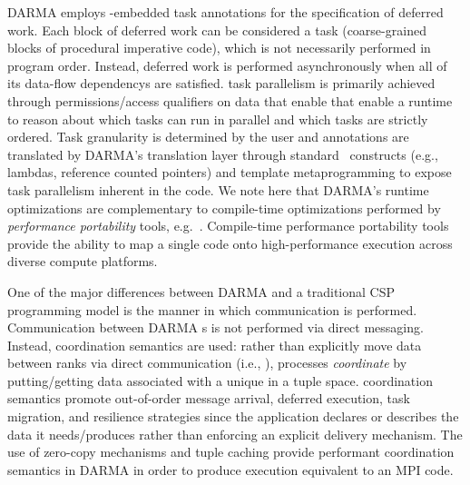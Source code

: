 \gls{DARMA} employs \CC-embedded task annotations for the specification of \gls{deferred
work}. Each block of \gls{deferred work} can be considered a task (coarse-grained blocks of 
\gls{procedural} \gls{imperative} code),  which is not necessarily performed in program order.   Instead,
\gls{deferred work} is performed asynchronously when all of its \glspl{data-flow dependency} are
satisfied.  \Gls{task parallelism} is primarily achieved through permissions/access qualifiers
on data that enable that enable a runtime to reason about which tasks can run in parallel and which tasks are strictly ordered.
Task granularity is determined by the user and annotations are translated by \gls{DARMA}'s \gls{translation
layer} through standard \CC\ constructs (e.g., \glspl{lambda}, \glspl{reference counted pointer}) and \gls{template metaprogramming} to
expose \gls{task parallelism} inherent in the code.
We note here that \gls{DARMA}'s runtime optimizations are complementary to
compile-time optimizations performed by \emph{performance
portability} tools, e.g.~\cite{Kokkos,RAJA,TiDA}.  Compile-time performance
portability tools provide the ability to map a
single code onto high-performance execution across diverse compute platforms.

One of the major differences between \gls{DARMA} and a traditional \gls{CSP}
\gls{programming model} is the manner in which communication is performed.  
Communication between \gls{DARMA} s is not performed via direct messaging.
Instead, \gls{coordination semantics} are used:   
rather than explicitly move data between ranks via direct communication
(i.e.,  ), processes \emph{coordinate} by putting/getting
data associated with a unique  in a \gls{tuple space}.  
\Gls{coordination semantics} promote out-of-order message arrival, deferred
execution, task migration, and resilience strategies 
since the application declares or describes the data it needs/produces rather than enforcing an explicit delivery mechanism.
The use of \gls{zero-copy} mechanisms and tuple caching provide 
performant \gls{coordination semantics} in \gls{DARMA} in order to
produce execution equivalent to an MPI  code. 


